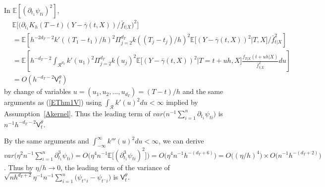 \documentclass[lettersize, 12pt]{article}
\begin{document}
In $\mathbb{E}[(\partial_{t_1} \psi_{ti})^2]$,
\begin{align*}
&\mathbb{E}\Big[
\big(
\partial_{t_1} K_h(T-t) (Y-\bar \gamma(t, X))/\bar f_{t|X}
\big)^2
\Big]
\\&= \mathbb{E}\left[
h^{-2d_T-2} k'((T_1-t_1)/h)^2 
\Pi_{j=2}^{d_T} k((T_j - t_j)/h)^2
\mathbb{E}\big[(Y-\bar \gamma(t, X))^2\big| T, X\big]/\bar f_{t|X}^2
\right]
\\&= \mathbb{E}\left[
h^{-d_T-2} \int_{\mathcal{R}^{d_T}} k'(u_1)^2 \Pi_{j=2}^{d_T}k(u_j)^2 \mathbb{E}\big[(Y-\bar \gamma(t, X))^2\big| T=t+uh, X\big]
\frac{f_{T|X}(t+uh|X)}{\bar f_{t|X}^2}du
\right]
\\&= O\left(h^{-d_T - 2} \mathsf{V}_t^\theta\right)
\end{align*}
by change of variables $u = (u_1, u_2,..., u_{d_T}) = (T-t)/h$ and 
the same arguments as (\ref{EThm1V}) using $\int_\mathcal{R} k'(u)^2 du < \infty$ implied by Assumption~\ref{Akernel}.
Thus the leading term of 
$var\big(n^{-1}\sum_{i=1}^n \partial_{t_1}\psi_{ti}\big)$  is $n^{-1}h^{-d_T-2} \mathsf{V}_t^\theta$.


By the same arguments and $\int_{-\infty}^{\infty} k'''(u)^2 du < \infty$, we can derive $var\big(\eta^2n^{-1}\sum_{i=1}^n \partial_{t_1}^3\psi_{ti}\big) 
= O\big(\eta^4n^{-1}\mathbb{E}\big[(\partial_{t_1}^3\psi_{ti})^2\big] \big)
= O\big(\eta^4 n^{-1}h^{-(d_T + 6)}\big)
= 
O\big((\eta/h)^4 \big) \times O\big(n^{-1}h^{-(d_T + 2)}\big)$.
Thus by $\eta/h\rightarrow 0$, the leading term of the variance of $\sqrt{nh^{d_T + 2}}\eta^{-1} n^{-1}\sum_{i=1}^n\big( \psi_{t^+i} - \psi_{t^-i}\big)$ is 
$\mathsf{V}_t^\theta$.


%
\end{document}
